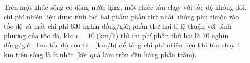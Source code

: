 \begin{ex}
Trên một khúc sông có dòng nước lặng, một chiếc tàu chạy với tốc độ không đổi, chi phí nhiên liệu được tính bởi hai phần: phần thứ nhất không phụ thuộc vào tốc độ và mất chi phí $630$ nghìn đồng/giờ; phần thứ hai tỉ lệ thuận với bình phương của tốc độ, khi $v=10$ (km/h) thì chi phí phần thứ hai là $70$ nghìn đồng/giờ. Tìm tốc độ của tàu (km/h) để tổng chi phí nhiên liệu khi tàu chạy $1$ km trên sông là ít nhất (kết quả làm tròn đến hàng phần trăm).
\end{ex}
